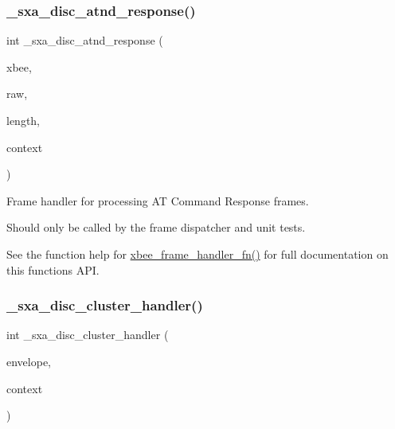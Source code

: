 \subsubsection{\texorpdfstring{\+\_\+sxa\+\_\+disc\+\_\+atnd\+\_\+response()}{\_sxa\_disc\_atnd\_response()}}
{\footnotesize\ttfamily int \+\_\+sxa\+\_\+disc\+\_\+atnd\+\_\+response (\begin{DoxyParamCaption}\item[{\hyperlink{structxbee__dev__t}{xbee\+\_\+dev\+\_\+t} $\ast$}]{xbee,  }\item[{const void \hyperlink{group__hal_gaef060b3456fdcc093a7210a762d5f2ed}{F\+AR} $\ast$}]{raw,  }\item[{\hyperlink{group__hal__dos_ga5a8b2dc9e45a9ee81a94ef304fb62505}{uint16\+\_\+t}}]{length,  }\item[{void \hyperlink{group__hal_gaef060b3456fdcc093a7210a762d5f2ed}{F\+AR} $\ast$}]{context }\end{DoxyParamCaption})}



Frame handler for processing AT Command Response frames. 

Should only be called by the frame dispatcher and unit tests.

See the function help for \hyperlink{group__xbee__device_ga3e6f2b540e8cec7a69ef0b0166da14ff}{xbee\+\_\+frame\+\_\+handler\+\_\+fn()} for full documentation on this function\textquotesingle{}s A\+PI. \mbox{\label{group___s_x_a_ga7129f2a09a9a49d26c50cbff75e50232}} 
\subsubsection{\texorpdfstring{\+\_\+sxa\+\_\+disc\+\_\+cluster\+\_\+handler()}{\_sxa\_disc\_cluster\_handler()}}
{\footnotesize\ttfamily int \+\_\+sxa\+\_\+disc\+\_\+cluster\+\_\+handler (\begin{DoxyParamCaption}\item[{const \hyperlink{structwpan__envelope__t}{wpan\+\_\+envelope\+\_\+t} \hyperlink{group__hal_gaef060b3456fdcc093a7210a762d5f2ed}{F\+AR} $\ast$}]{envelope,  }\item[{void \hyperlink{group__hal_gaef060b3456fdcc093a7210a762d5f2ed}{F\+AR} $\ast$}]{context }\end{DoxyParamCaption})}




